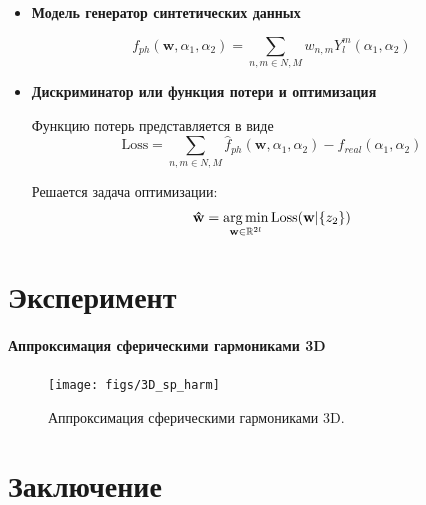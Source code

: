 \documentclass[12pt,twoside]{article}
\begin{document}
\begin{itemize}
\item \textbf{Модель генератор синтетических данных}

\begin{equation}
	f_{ph}(\mathbf{w},\alpha_1,\alpha_2) = \sum_{n,m \in N,M} w_{n,m}Y_l^m(\alpha_1,\alpha_2)
\label{eq:f_ph_3d}
\end{equation}
\vspace{\baselineskip}

\item \textbf{Дискриминатор или функция потери и оптимизация}

Функцию потерь представляется в виде
\begin{equation}
\textrm{Loss} =  \sum_{n,m \in N,M} \hat{f}_{ph}(\mathbf{w},\alpha_1,\alpha_2) - f_{real}(\alpha_{1},\alpha_2)
\label{eq:L_3d}
\end{equation}

Решается задача оптимизации:
\begin{equation}
\mathbf{\hat{w}} = \argmin_{\mathbf{w} \in \mathbb{R}^{2l}} \textrm{Loss}(\mathbf{w}|\{z_{2}\})
\label{eq:arg_l}
\end{equation}
\end{itemize}


\section{Эксперимент}

\paragraph{Аппроксимация сферическими гармониками 3D}

\begin{figure}[h]
\centering
\texttt{[image: figs/3D\_sp\_harm]}
\caption{Аппроксимация сферическими гармониками 3D. }
\label{fg:3D_sp_harm}
\end{figure}

\section{Заключение}
\newpage


\end{document}
